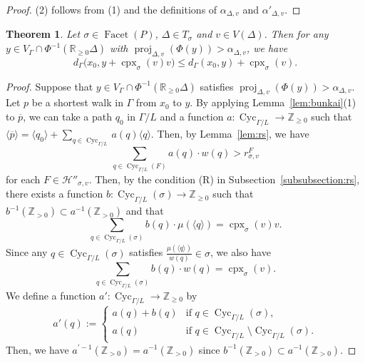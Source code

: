 \documentclass[11pt]{article}
\newtheorem{thm}[theo]{Theorem}
\theoremstyle{definition}
\numberwithin{equation}{section}
\begin{document}
\begin{proof}
(2) follows from (1) and the definitions of $\alpha _{\Delta, v}$ and $\alpha' _{\Delta, v}$. 
\end{proof}

\begin{thm}\label{thm:mod}
Let $\sigma \in \operatorname{Facet}(P)$, $\Delta \in T_{\sigma}$ and $v \in V(\Delta)$. 
Then for any $y \in V_{\Gamma} \cap \Phi ^{-1}( \mathbb{R}_{\ge 0} \Delta)$ with $\operatorname{proj}_{\Delta, v} (\Phi(y)) > \alpha _{\Delta, v}$, we have  
\[
d_{\Gamma}\bigl( x_0, y + \operatorname{cpx}_{\sigma}(v)v \bigr) 
\le d_{\Gamma}( x_0, y) + \operatorname{cpx}_{\sigma}(v).
\]
\end{thm}
\begin{proof}
Suppose that  $y \in V_{\Gamma} \cap \Phi ^{-1}( \mathbb{R}_{\ge 0} \Delta)$ satisfies $\operatorname{proj}_{\Delta, v} (\Phi(y)) > \alpha _{\Delta, v}$. 
Let $p$ be a shortest walk in $\Gamma$ from $x_0$ to $y$. 
By applying Lemma~\ref{lem:bunkai}(1) to $\overline{p}$, 
we can take a path $q_0$ in $\Gamma /L$ and a function $a : \operatorname{Cyc}_{\Gamma /L} \to \mathbb{Z}_{\ge 0}$ 
such that $\langle \overline{p} \rangle = \langle q_0 \rangle + \sum _{q \in \operatorname{Cyc}_{\Gamma /L}} a(q) \langle q \rangle$. 
Then, by Lemma~\ref{lem:rs}, we have 
\[
\sum _{q \in \operatorname{Cyc}_{\Gamma /L}(F)} a(q) \cdot w(q) > r^{F} _{\sigma, v}
\]
for each $F \in \mathcal{H}'' _{\sigma, v}$. 
Then, by the condition (R) in Subsection~\ref{subsubsection:rs}, 
there exists a function $b: \operatorname{Cyc}_{\Gamma /L}(\sigma) \to \mathbb{Z}_{\ge 0}$ such that 
$b^{-1}(\mathbb{Z}_{>0}) \subset a^{-1}(\mathbb{Z}_{>0})$ and that 
\[
\sum _{q \in \operatorname{Cyc}_{\Gamma /L}(\sigma)} b(q) \cdot \mu(\langle q \rangle) = \operatorname{cpx}_{\sigma}(v) v.
\]
Since any $q \in \operatorname{Cyc}_{\Gamma /L}(\sigma)$ satisfies $\frac{\mu(\langle q \rangle)}{w(q)} \in \sigma$, 
we also have 
\[
\sum _{q \in \operatorname{Cyc}_{\Gamma /L}(\sigma)} b(q) \cdot w(q) = \operatorname{cpx}_{\sigma}(v). 
\]
We define a function $a' : \operatorname{Cyc}_{\Gamma /L} \to \mathbb{Z}_{\ge 0}$ by 
\[
a'(q) := 
\begin{cases}
a(q) + b(q) & \text{if $q \in \operatorname{Cyc}_{\Gamma /L}(\sigma)$,} \\
a(q)  & \text{if $q \in \operatorname{Cyc}_{\Gamma /L} \setminus \operatorname{Cyc}_{\Gamma /L}(\sigma)$}. 
\end{cases}
\]
Then, we have $a^{\prime -1}(\mathbb{Z}_{>0}) = a^{-1}(\mathbb{Z}_{>0})$ since $b^{-1}(\mathbb{Z}_{>0}) \subset a^{-1}(\mathbb{Z}_{>0})$. 

\end{proof}
\end{document}

